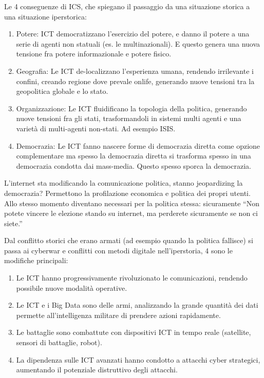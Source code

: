 \documentclass[a4page, 11pt]{article}
\begin{document}
Le 4 conseguenze di ICS, che spiegano il passaggio da una situazione
storica a una situazione iperstorica:

\begin{enumerate}
	\def\labelenumi{\arabic{enumi})}
	 
	\item
	Potere: ICT democratizzano l'esercizio del potere, e danno il potere a
	una serie di agenti non statuali (es. le multinazionali). E questo
	genera una nuova tensione fra potere informazionale e potere fisico.
	\item
	Geografia: Le ICT de-localizzano l'esperienza umana, rendendo
	irrilevante i confini, creando regione dove prevale onlife, generando
	nuove tensioni tra la geopolitica globale e lo stato.
	\item
	Organizzazione: Le ICT fluidificano la topologia della politica,
	generando nuove tensioni fra gli stati, trasformandoli in sistemi
	multi agenti e una varietà di multi-agenti non-stati. Ad esempio ISIS.
	\item
	Democrazia: Le ICT fanno nascere forme di democrazia diretta come
	opzione complementare ma spesso la democrazia diretta si trasforma
	spesso in una democrazia condotta dai mass-media. Questo spesso sporca
	la democrazia.
\end{enumerate}

L'internet sta modificando la comunicazione politica, stanno
jeopardizing la democrazia? Permettono la profilazione economica e
politica dei propri utenti. Allo stesso momento diventano necessari per
la politica stessa: sicuramente ``Non potete vincere le elezione stando
su internet, ma perderete sicuramente se non ci siete.''

Dal conflitto storici che erano armati (ad esempio quando la politica
fallisce) si passa ai cyberwar e conflitti con metodi digitale
nell'iperstoria, 4 sono le modifiche principali:

\begin{enumerate}
	\def\labelenumi{\arabic{enumi})}
	 
	\item
	Le ICT hanno progressivamente rivoluzionato le comunicazioni, rendendo
	possibile nuove modalità operative.
	\item
	Le ICT e i Big Data sono delle armi, analizzando la grande quantità
	dei dati permette all'intelligenza militare di prendere azioni
	rapidamente.
	\item
	Le battaglie sono combattute con dispositivi ICT in tempo reale
	(satellite, sensori di battaglie, robot).
	\item
	La dipendenza sulle ICT avanzati hanno condotto a attacchi cyber
	strategici, aumentando il potenziale distruttivo degli attacchi.
\end{enumerate}
\end{document}

